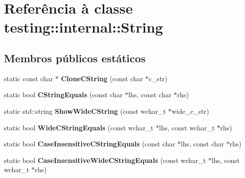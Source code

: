 \hypertarget{classtesting_1_1internal_1_1String}{\section{Referência à classe testing\-:\-:internal\-:\-:String}
\label{classtesting_1_1internal_1_1String}
}
\subsection*{Membros públicos estáticos}
\begin{DoxyCompactItemize}
\item 
\hypertarget{classtesting_1_1internal_1_1String_a8bce6b1281ae3d2f9061b920aa78aca0}{static const char $\ast$ {\bfseries Clone\-C\-String} (const char $\ast$c\-\_\-str)}\label{classtesting_1_1internal_1_1String_a8bce6b1281ae3d2f9061b920aa78aca0}

\item 
\hypertarget{classtesting_1_1internal_1_1String_a8bea7b33e7effbd299a0b4a5522ea96e}{static bool {\bfseries C\-String\-Equals} (const char $\ast$lhs, const char $\ast$rhs)}\label{classtesting_1_1internal_1_1String_a8bea7b33e7effbd299a0b4a5522ea96e}

\item 
\hypertarget{classtesting_1_1internal_1_1String_aaf7e376ff580677ea4954d5913d5b917}{static std\-::string {\bfseries Show\-Wide\-C\-String} (const wchar\-\_\-t $\ast$wide\-\_\-c\-\_\-str)}\label{classtesting_1_1internal_1_1String_aaf7e376ff580677ea4954d5913d5b917}

\item 
\hypertarget{classtesting_1_1internal_1_1String_ab0373bf6e96453d6ca0de2e68df13d3a}{static bool {\bfseries Wide\-C\-String\-Equals} (const wchar\-\_\-t $\ast$lhs, const wchar\-\_\-t $\ast$rhs)}\label{classtesting_1_1internal_1_1String_ab0373bf6e96453d6ca0de2e68df13d3a}

\item 
\hypertarget{classtesting_1_1internal_1_1String_a116ca435d63306927ba19f90a3596787}{static bool {\bfseries Case\-Insensitive\-C\-String\-Equals} (const char $\ast$lhs, const char $\ast$rhs)}\label{classtesting_1_1internal_1_1String_a116ca435d63306927ba19f90a3596787}

\item 
\hypertarget{classtesting_1_1internal_1_1String_a1f12d1780ca7afbf8975f5d425b9f362}{static bool {\bfseries Case\-Insensitive\-Wide\-C\-String\-Equals} (const wchar\-\_\-t $\ast$lhs, const wchar\-\_\-t $\ast$rhs)}\label{classtesting_1_1internal_1_1String_a1f12d1780ca7afbf8975f5d425b9f362}


\end{DoxyCompactItemize}

